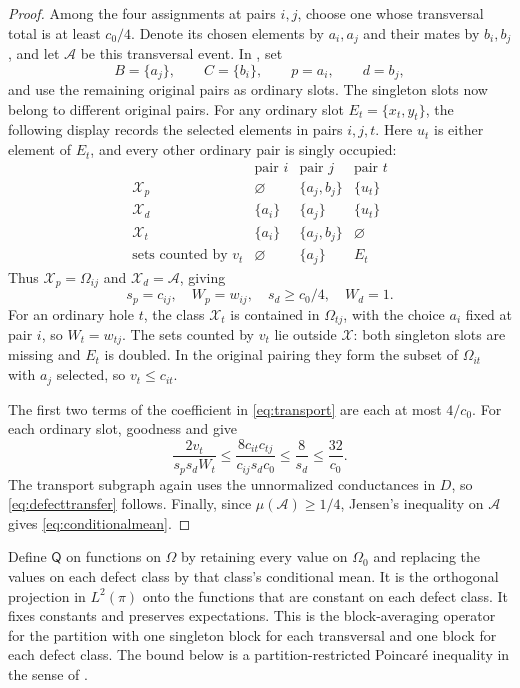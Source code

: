 \documentclass[11pt]{article}
\theoremstyle{definition}
\newcommand{\Om}{\Omega}
\newcommand{\Qproj}{\mathsf Q}
\begin{document}
\begin{proof}
Among the four assignments at pairs $i,j$, choose one whose transversal
total is at least $c_0/4$.  Denote its chosen elements by $a_i,a_j$ and
their mates by $b_i,b_j$, and let $\mathcal A$ be this transversal event.
In , set
\[
 B=\{a_j\},\qquad C=\{b_i\},\qquad p=a_i,\qquad d=b_j,
\]
and use the remaining original pairs as ordinary slots.  The singleton
slots now belong to different original pairs.  For any ordinary
slot $E_t=\{x_t,y_t\}$, the following display records the selected
elements in pairs $i,j,t$.  Here $u_t$ is either element of $E_t$,
and every other ordinary pair is singly occupied:
\[
\begin{array}{c|ccc}
 &\text{pair }i&\text{pair }j&\text{pair }t\\ \hline
 \mathcal X_p&\varnothing&\{a_j,b_j\}&\{u_t\}\\
 \mathcal X_d&\{a_i\}&\{a_j\}&\{u_t\}\\
 \mathcal X_t&\{a_i\}&\{a_j,b_j\}&\varnothing\\
 \text{sets counted by }v_t&\varnothing&\{a_j\}&E_t
\end{array}
\]
Thus $\mathcal X_p=\Om_{ij}$ and $\mathcal X_d=\mathcal A$, giving
\[
 s_p=c_{ij},\quad W_p=w_{ij},\quad s_d\ge c_0/4,\quad W_d=1.
\]
For an ordinary hole $t$, the class $\mathcal X_t$ is contained in
$\Om_{tj}$, with the choice $a_i$ fixed at pair $i$, so $W_t=w_{tj}$.
The sets counted by $v_t$ lie outside $\mathcal X$: both singleton
slots are missing and $E_t$ is doubled.  In the original pairing they
form the subset of $\Om_{it}$ with $a_j$ selected, so $v_t\le c_{it}$.

The first two terms of the coefficient in \eqref{eq:transport} are each
at most $4/c_0$.  For each ordinary slot, goodness and
 give
\[
 \frac{2v_t}{s_ps_dW_t}
 \le\frac{8c_{it}c_{tj}}{c_{ij}s_dc_0}
 \le\frac8{s_d}\le\frac{32}{c_0}.
\]
The transport subgraph again uses the unnormalized conductances in $D$, so
\eqref{eq:defecttransfer} follows.  Finally, since $\mu(\mathcal A)\ge1/4$, Jensen's inequality on
$\mathcal A$ gives \eqref{eq:conditionalmean}.
\end{proof}

Define $\Qproj$ on functions on $\Om$ by retaining every value on
$\Om_0$ and replacing the values on each defect class by that class's
conditional mean.  It is the orthogonal projection in $L^2(\pi)$ onto
the functions that are constant on each defect class.  It fixes
constants and preserves expectations.  This is the block-averaging operator
for the partition with one singleton block for each transversal and one
block for each defect class.
The bound below is a partition-restricted Poincar\'e inequality in the
sense of \cite[Definition~4]{CVY2026}.
\end{document}
